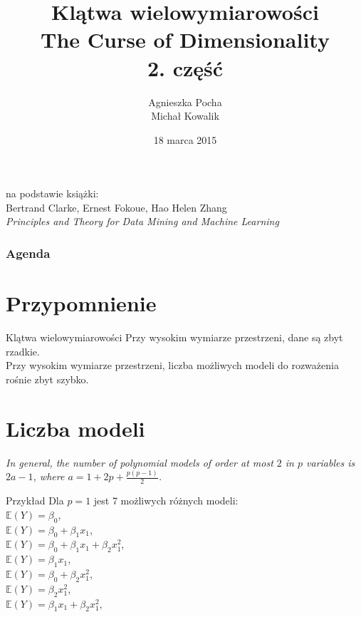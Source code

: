 \documentclass[a4paper]{beamer}
\author{Agnieszka Pocha \\ Michał Kowalik}
\title{Klątwa wielowymiarowości \\ The Curse of Dimensionality \\ 2. część}
\date{18 marca 2015}
\begin{document}
\begin{frame}
\titlepage
{\footnotesize
na podstawie książki: \\
Bertrand Clarke, Ernest Fokoue, Hao Helen Zhang \\
}
\textit{Principles and Theory for Data Mining and Machine Learning}
\end{frame}


\begin{frame}
\frametitle{Agenda}
\tableofcontents
\end{frame}

\section{Przypomnienie}
\begin{frame}
\begin{block}{Klątwa wielowymiarowości}
Przy wysokim wymiarze przestrzeni, dane są zbyt rzadkie. \\
Przy wysokim wymiarze przestrzeni, liczba możliwych modeli do rozważenia rośnie zbyt szybko.
\end{block}
\end{frame}

\section{Liczba modeli}
\begin{frame}
\begin{block}{}
\textit{In general, the number of polynomial models of order at most $2$ in $p$ variables is $2a - 1$, where $a = 1 + 2p + \frac{p(p-1)}{2}$.}
\end{block}
\begin{block}{Przykład}
Dla $p=1$ jest 7 możliwych różnych modeli: \\
$\mathbb{E}(Y) = \beta_0$, \\
$\mathbb{E}(Y) = \beta_0 + \beta_1 x_1$, \\
$\mathbb{E}(Y) = \beta_0 + \beta_1 x_1 + \beta_2 x_1^2$, \\[0.3cm]


$\mathbb{E}(Y) = \beta_1 x_1$, \\
$\mathbb{E}(Y) = \beta_0 + \beta_2 x_1^2$, \\[0.3cm]


$\mathbb{E}(Y) = \beta_2 x_1^2$, \\
$\mathbb{E}(Y) = \beta_1 x_1 + \beta_2 x_1^2$, \\

\end{block}
\end{frame}
\end{document}

